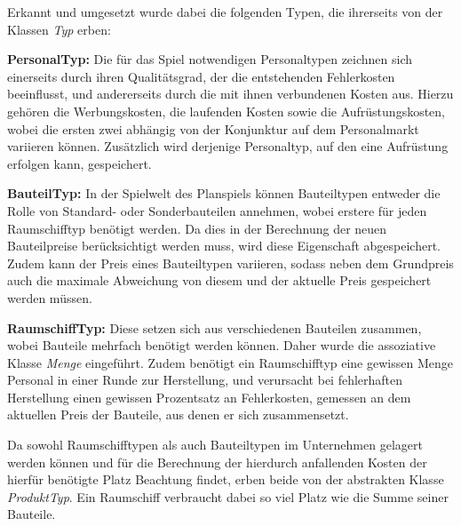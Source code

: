Erkannt und umgesetzt wurde dabei die folgenden Typen, die ihrerseits von der Klassen \textit{Typ} erben:
\begin{seList}
\item \textbf{PersonalTyp:} Die für das Spiel notwendigen Personaltypen zeichnen sich einerseits durch ihren Qualitätsgrad, der die entstehenden Fehlerkosten beeinflusst, und andererseits durch die mit ihnen verbundenen Kosten aus. Hierzu gehören die Werbungskosten, die laufenden Kosten sowie die Aufrüstungskosten, wobei die ersten zwei abhängig von der Konjunktur auf dem Personalmarkt variieren können. Zusätzlich wird derjenige Personaltyp, auf den eine Aufrüstung erfolgen kann, gespeichert.
\item \textbf{BauteilTyp:} In der Spielwelt des Planspiels können Bauteiltypen entweder die Rolle von Standard- oder Sonderbauteilen annehmen, wobei erstere für jeden Raumschifftyp benötigt werden. Da dies in der Berechnung der neuen Bauteilpreise berücksichtigt werden muss, wird diese Eigenschaft abgespeichert. Zudem kann der Preis eines Bauteiltypen variieren, sodass neben dem Grundpreis auch die maximale Abweichung von diesem und der aktuelle Preis gespeichert werden müssen.
\item \textbf{RaumschiffTyp:} Diese setzen sich aus verschiedenen Bauteilen zusammen, wobei Bauteile mehrfach benötigt werden können. Daher wurde die assoziative Klasse \textit{Menge} eingeführt. Zudem benötigt ein Raumschifftyp eine gewissen Menge Personal in einer Runde zur Herstellung, und verursacht bei fehlerhaften Herstellung einen gewissen Prozentsatz an Fehlerkosten, gemessen an dem aktuellen Preis der Bauteile, aus denen er sich zusammensetzt.
\end{seList}

Da sowohl Raumschifftypen als auch Bauteiltypen im Unternehmen gelagert werden können und für die Berechnung der hierdurch anfallenden Kosten der hierfür benötigte Platz Beachtung findet, erben beide von der abstrakten Klasse \textit{ProduktTyp}. Ein Raumschiff verbraucht dabei so viel Platz wie die Summe seiner Bauteile.

